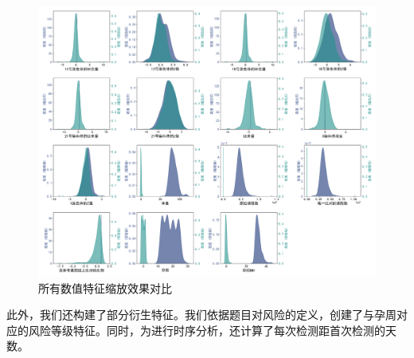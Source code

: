 \begin{figure}[h!]
\centering
\includegraphics[width=1\textwidth]{figs/2模型准备/图6_所有数值特征缩放效果对比}
\caption{所有数值特征缩放效果对比}
\label{fig:所有数值特征缩放效果对比}
\end{figure}


此外，我们还构建了部分衍生特征。我们依据题目对风险的定义，创建了与孕周对应的风险等级特征。同时，为进行时序分析，还计算了每次检测距首次检测的天数。